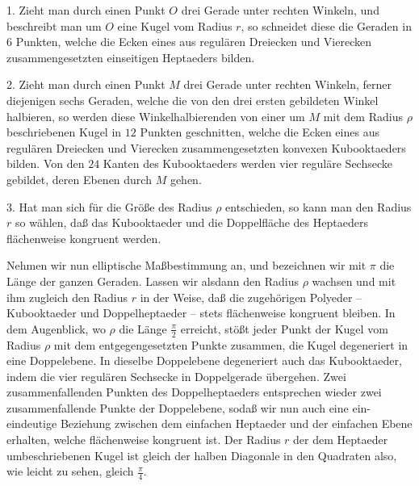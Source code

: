\documentclass[11pt,a4paper]{article}
\begin{document}
1. Zieht man durch einen Punkt $O$ drei Gerade unter rechten Winkeln, und beschreibt man um $O$ eine Kugel vom Radius $r$, so schneidet diese die Geraden in $6$ Punkten, welche die Ecken eines aus regul\"aren Dreiecken und Vierecken zusammengesetzten einseitigen Heptaeders bilden.

2. Zieht man durch einen Punkt $M$ drei Gerade unter rechten Winkeln, ferner diejenigen sechs Geraden, welche die von den drei ersten gebildeten Winkel halbieren, so werden diese Winkelhalbierenden von einer um $M$ mit dem Radius $\rho$ beschriebenen Kugel in $12$ Punkten geschnitten, welche die Ecken eines aus regul\"aren Dreiecken und Vierecken zusammengesetzten konvexen Kubooktaeders bilden. Von den $24$ Kanten des Kubooktaeders werden vier regul\"are Sechsecke gebildet, deren Ebenen durch $M$ gehen.

3. Hat man sich f\"ur die Gr\"o\ss{}e des Radius $\rho$ entschieden, so kann man den Radius $r$ so w\"ahlen, da\ss{} das Kubooktaeder und die Doppelfl\"ache des Heptaeders fl\"achenweise kongruent werden.

Nehmen wir nun elliptische Ma\ss{}bestimmung an, und bezeichnen wir mit $\pi$ die L\"ange der ganzen Geraden. Lassen wir alsdann den Radius $\rho$ wachsen und mit ihm zugleich den Radius $r$ in der Weise, da\ss{} die zugeh\"origen Polyeder -- Kubooktaeder und Doppelheptaeder -- stets fl\"achenweise kongruent bleiben. In dem Augenblick, wo $\rho$ die L\"ange $\frac{\pi}{2}$ erreicht, st\"o\ss{}t jeder Punkt der Kugel vom Radius $\rho$ mit dem entgegengesetzten Punkte zusammen, die Kugel degeneriert in eine Doppelebene. In dieselbe Doppelebene degeneriert auch das Kubooktaeder, indem die vier regul\"aren Sechsecke in Doppelgerade \"ubergehen. Zwei zusammenfallenden Punkten des Doppelheptaeders entsprechen wieder zwei zusammenfallende Punkte der Doppelebene, soda\ss{} wir nun auch eine ein-eindeutige Beziehung zwischen dem einfachen Heptaeder und der einfachen Ebene erhalten, welche fl\"achenweise kongruent ist. Der Radius $r$ der dem Heptaeder umbeschriebenen Kugel ist gleich der halben Diagonale in den Quadraten also, wie leicht zu sehen, gleich $\frac{\pi}{4}$.
\end{document}
